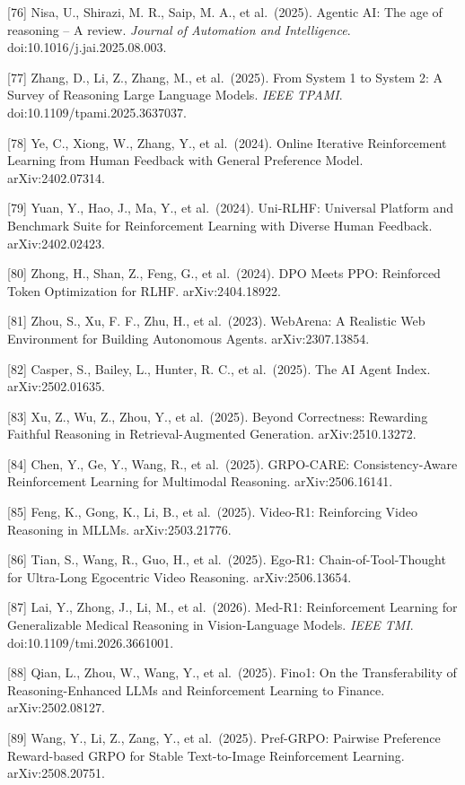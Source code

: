 {[}76{]} Nisa, U., Shirazi, M. R., Saip, M. A., et al.~(2025). Agentic AI: The age of reasoning -- A review. \emph{Journal of Automation and Intelligence}. doi:10.1016/j.jai.2025.08.003.

{[}77{]} Zhang, D., Li, Z., Zhang, M., et al.~(2025). From System 1 to System 2: A Survey of Reasoning Large Language Models. \emph{IEEE TPAMI}. doi:10.1109/tpami.2025.3637037.

{[}78{]} Ye, C., Xiong, W., Zhang, Y., et al.~(2024). Online Iterative Reinforcement Learning from Human Feedback with General Preference Model. arXiv:2402.07314.

{[}79{]} Yuan, Y., Hao, J., Ma, Y., et al.~(2024). Uni-RLHF: Universal Platform and Benchmark Suite for Reinforcement Learning with Diverse Human Feedback. arXiv:2402.02423.

{[}80{]} Zhong, H., Shan, Z., Feng, G., et al.~(2024). DPO Meets PPO: Reinforced Token Optimization for RLHF. arXiv:2404.18922.

{[}81{]} Zhou, S., Xu, F. F., Zhu, H., et al.~(2023). WebArena: A Realistic Web Environment for Building Autonomous Agents. arXiv:2307.13854.

{[}82{]} Casper, S., Bailey, L., Hunter, R. C., et al.~(2025). The AI Agent Index. arXiv:2502.01635.

{[}83{]} Xu, Z., Wu, Z., Zhou, Y., et al.~(2025). Beyond Correctness: Rewarding Faithful Reasoning in Retrieval-Augmented Generation. arXiv:2510.13272.

{[}84{]} Chen, Y., Ge, Y., Wang, R., et al.~(2025). GRPO-CARE: Consistency-Aware Reinforcement Learning for Multimodal Reasoning. arXiv:2506.16141.

{[}85{]} Feng, K., Gong, K., Li, B., et al.~(2025). Video-R1: Reinforcing Video Reasoning in MLLMs. arXiv:2503.21776.

{[}86{]} Tian, S., Wang, R., Guo, H., et al.~(2025). Ego-R1: Chain-of-Tool-Thought for Ultra-Long Egocentric Video Reasoning. arXiv:2506.13654.

{[}87{]} Lai, Y., Zhong, J., Li, M., et al.~(2026). Med-R1: Reinforcement Learning for Generalizable Medical Reasoning in Vision-Language Models. \emph{IEEE TMI}. doi:10.1109/tmi.2026.3661001.

{[}88{]} Qian, L., Zhou, W., Wang, Y., et al.~(2025). Fino1: On the Transferability of Reasoning-Enhanced LLMs and Reinforcement Learning to Finance. arXiv:2502.08127.

{[}89{]} Wang, Y., Li, Z., Zang, Y., et al.~(2025). Pref-GRPO: Pairwise Preference Reward-based GRPO for Stable Text-to-Image Reinforcement Learning. arXiv:2508.20751.


